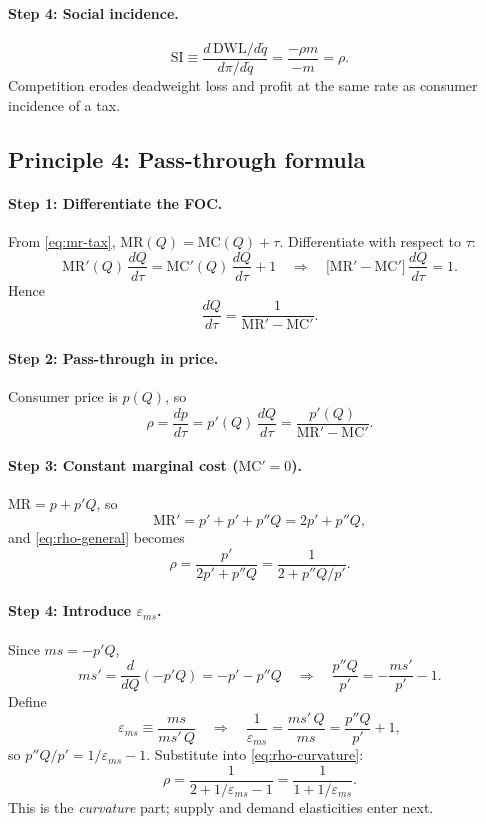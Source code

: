 \documentclass[11pt]{article}
\begin{document}
\paragraph{Step 4: Social incidence.}
\[
  \mathrm{SI}
  \equiv \frac{d\,\mathrm{DWL}/d\tilde q}{d\pi/d\tilde q}
  = \frac{-\rho m}{-m}
  = \rho.
\]
Competition erodes deadweight loss and profit at the same rate as consumer
incidence of a tax.

\subsection{Principle 4: Pass-through formula}

\paragraph{Step 1: Differentiate the FOC.}
From \eqref{eq:mr-tax}, $\mathrm{MR}(Q) = \mathrm{MC}(Q) + \tau$.
Differentiate with respect to $\tau$:
\[
  \mathrm{MR}'(Q)\,\frac{dQ}{d\tau}
  = \mathrm{MC}'(Q)\,\frac{dQ}{d\tau} + 1
  \quad\Rightarrow\quad
  \bigl[\mathrm{MR}' - \mathrm{MC}'\bigr]\,\frac{dQ}{d\tau} = 1.
\]
Hence
\[
  \frac{dQ}{d\tau} = \frac{1}{\mathrm{MR}' - \mathrm{MC}'}.
\]

\paragraph{Step 2: Pass-through in price.}
Consumer price is $p(Q)$, so
\begin{equation}
  \rho = \frac{dp}{d\tau}
  = p'(Q)\,\frac{dQ}{d\tau}
  = \frac{p'(Q)}{\mathrm{MR}' - \mathrm{MC}'}.
  \label{eq:rho-general}
\end{equation}

\paragraph{Step 3: Constant marginal cost ($\mathrm{MC}' = 0$).}
$\mathrm{MR} = p + p'Q$, so
\[
  \mathrm{MR}' = p' + p' + p''Q = 2p' + p''Q,
\]
and \eqref{eq:rho-general} becomes
\begin{equation}
  \rho = \frac{p'}{2p' + p''Q}
  = \frac{1}{2 + p''Q/p'}.
  \label{eq:rho-curvature}
\end{equation}

\paragraph{Step 4: Introduce $\varepsilon_{ms}$.}
Since $ms = -p'Q$,
\[
  ms' = \frac{d}{dQ}(-p'Q) = -p' - p''Q
  \quad\Rightarrow\quad
  \frac{p''Q}{p'} = -\frac{ms'}{p'} - 1.
\]
Define
\[
  \varepsilon_{ms} \equiv \frac{ms}{ms'\,Q}
  \quad\Rightarrow\quad
  \frac{1}{\varepsilon_{ms}} = \frac{ms'\,Q}{ms}
  = \frac{p''Q}{p'} + 1,
\]
so $p''Q/p' = 1/\varepsilon_{ms} - 1$.  Substitute into
\eqref{eq:rho-curvature}:
\[
  \rho = \frac{1}{2 + 1/\varepsilon_{ms} - 1}
  = \frac{1}{1 + 1/\varepsilon_{ms}}.
\]
This is the \emph{curvature} part; supply and demand elasticities enter next.
\end{document}

